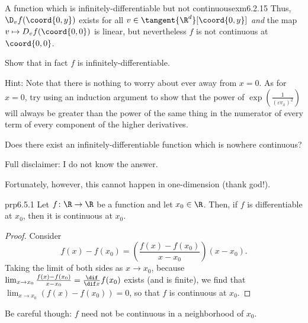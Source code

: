 \begin{exm}{A function which is infinitely-differentiable but not continuous}{exm6.2.15}
Thus, $\D _vf(\coord{0,y})$ exists for all $v\in \tangent{\R ^d}[\coord{0,y}]$ \emph{and} the map $v\mapsto D _vf(\coord{0,0})$ is linear, but nevertheless $f$ is not continuous at $\coord{0,0}$.

\begin{exr}[breakable=false]{}{}
Show that in fact $f$ is infinitely-differentiable.
\begin{rmk}
Hint:  Note that there is nothing to worry about ever away from $x=0$.  As for $x=0$, try using an induction argument to show that the power of $\exp \left( \tfrac{1}{(\varepsilon v_x)^2}\right)$ will always be greater than the power of the same thing in the numerator of every term of every component of the higher derivatives.
\end{rmk}
\end{exr}
\end{exm}
\begin{exr}{}{}
Does there exist an infinitely-differentiable function which is nowhere continuous?
\begin{rmk}
Full disclaimer:  I do not know the answer.
\end{rmk}
\end{exr}
Fortunately, however, this cannot happen in one-dimension (thank god!).
\begin{prp}{}{prp6.5.1}
Let $f\colon \R \rightarrow \R$ be a function and let $x_0\in \R$.  Then, if $f$ is differentiable at $x_0$, then it is continuous at $x_0$.
\begin{proof}
Consider
\begin{equation}
f(x)-f(x_0)=\left( \frac{f(x)-f(x_0)}{x-x_0}\right) (x-x_0).
\end{equation}
Taking the limit of both sides as $x\to x_0$, because $\lim _{x\to x_0}\frac{f(x)-f(x_0)}{x-x_0}=\frac{\dif}{\dif x}f(x_0)$ exists (and is finite), we find that $\lim _{x\to x_0}(f(x)-f(x_0))=0$, so that $f$ is continuous at $x_0$.
\end{proof}
\end{prp}
Be careful though:  $f$ need not be continuous in a neighborhood of $x_0$.
